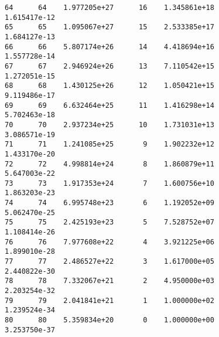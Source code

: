 \documentclass[11pt]{article}
\begin{document}
\begin{Verbatim}[commandchars=\\\{\}]
64      64    1.977205e+27      16    1.345861e+18               1.615417e-12
65      65    1.095067e+27      15    2.533385e+17               1.684127e-13
66      66    5.807174e+26      14    4.418694e+16               1.557728e-14
67      67    2.946924e+26      13    7.110542e+15               1.272051e-15
68      68    1.430125e+26      12    1.050421e+15               9.119486e-17
69      69    6.632464e+25      11    1.416298e+14               5.702463e-18
70      70    2.937234e+25      10    1.731031e+13               3.086571e-19
71      71    1.241085e+25       9    1.902232e+12               1.433170e-20
72      72    4.998814e+24       8    1.860879e+11               5.647003e-22
73      73    1.917353e+24       7    1.600756e+10               1.863203e-23
74      74    6.995748e+23       6    1.192052e+09               5.062470e-25
75      75    2.425193e+23       5    7.528752e+07               1.108414e-26
76      76    7.977608e+22       4    3.921225e+06               1.899010e-28
77      77    2.486527e+22       3    1.617000e+05               2.440822e-30
78      78    7.332067e+21       2    4.950000e+03               2.203254e-32
79      79    2.041841e+21       1    1.000000e+02               1.239524e-34
80      80    5.359834e+20       0    1.000000e+00               3.253750e-37

    \end{Verbatim}


    
    
    
    
\end{document}
